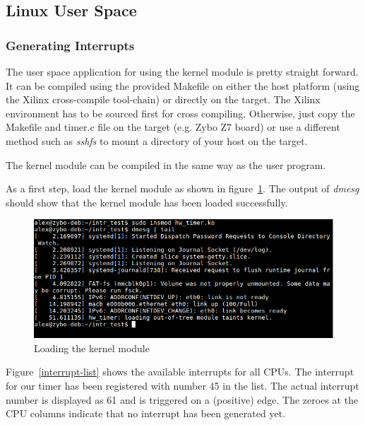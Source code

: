 
\subsection{Linux User Space}

\subsubsection{Generating Interrupts}

The user space application for using the kernel module is pretty straight forward.
It can be compiled using the provided Makefile on either the host platform (using the Xilinx cross-compile tool-chain) or directly on the target.
The Xilinx environment has to be sourced first for cross compiling.
Otherwise, just copy the Makefile and timer.c file on the target (e.g. Zybo Z7 board) or use a different method such as \emph{sshfs} to mount a directory of your host on the target.

The kernel module can be compiled in the same way as the user program.

As a first step, load the kernel module as shown in figure~\ref{fig:enable-logic}.
The output of \emph{dmesg} should show that the kernel module has been loaded successfully.

\begin{figure}[ht]
    \centering
    \includegraphics[width=1.0\textwidth,height=1.0\textheight,keepaspectratio]{figures/loaded_driver.png}
    \caption{Loading the kernel module}
    \label{fig:enable-logic}
\end{figure}

Figure~\ref{interrupt-list} shows the available interrupts for all CPUs.
The interrupt for our timer has been registered with number 45 in the list.
The actual interrupt number is displayed as 61 and is triggered on a (positive) edge.
The zeroes at the CPU columns indicate that no interrupt has been generated yet.

